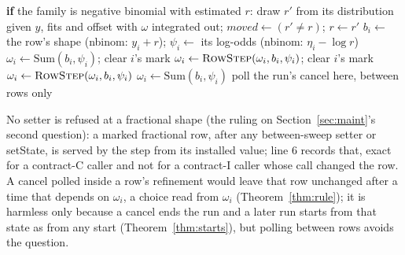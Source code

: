 \documentclass[11pt]{article}
\theoremstyle{definition}
\begin{document}
\begin{algorithm}[H]
\caption{Latent step at the start of a sweep}\label{alg:sweep}
\begin{algorithmic}[1]
\State \textbf{if} the family is negative binomial with estimated $r$: draw $r'$ from its distribution given $y$,
fits and offset with $\omega$ integrated out; $\mathit{moved}\gets(r'\neq r)$; $r\gets r'$
 
  \State $b_i\gets$ the row's shape (nbinom: $y_i+r$); $\psi_i\gets$ its log-odds (nbinom: $\eta_i-\log r$)
     \State $\omega_i\gets\mathrm{Sum}(b_i,\psi_i)$; clear $i$'s mark
   
     \State $\omega_i\gets\textsc{RowStep}(\omega_i,b_i,\psi_i)$; clear $i$'s mark
   
     \State $\omega_i\gets\textsc{RowStep}(\omega_i,b_i,\psi_i)$
  \Else
     \State $\omega_i\gets\mathrm{Sum}(b_i,\psi_i)$
  \EndIf
  \State poll the run's cancel here, between rows only
\EndFor
\end{algorithmic}
\end{algorithm}
No setter is refused at a fractional shape (the ruling on Section~\ref{sec:maint}'s second question): a marked
fractional row, after any between-sweep setter or setState, is served by the step from its installed value; line 6
records that, exact for a contract-C caller and not for a contract-I caller whose call changed the row.
A cancel polled inside a row's refinement would leave that row unchanged after a time that depends on
$\omega_i$, a choice read from $\omega_i$ (Theorem~\ref{thm:rule}); it is harmless only because a cancel ends the
run and a later run starts from that state as from any start (Theorem~\ref{thm:starts}), but polling between rows
avoids the question.
\end{document}
